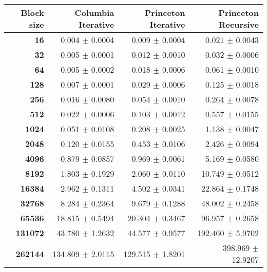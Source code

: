 \begin{tabular}{rrrr}\toprule
\textbf{Block size}  & \textbf{Columbia Iterative} & \textbf{Princeton Iterative} & \textbf{Princeton Recursive}\\\midrule
\textbf{16}  & 0.004 $\pm$ 0.0004 & 0.009 $\pm$ 0.0004 & 0.021 $\pm$ 0.0043\\
\textbf{32}  & 0.005 $\pm$ 0.0001 & 0.012 $\pm$ 0.0010 & 0.032 $\pm$ 0.0006\\
\textbf{64}  & 0.005 $\pm$ 0.0002 & 0.018 $\pm$ 0.0006 & 0.061 $\pm$ 0.0010\\
\textbf{128}  & 0.007 $\pm$ 0.0001 & 0.029 $\pm$ 0.0006 & 0.125 $\pm$ 0.0018\\
\textbf{256}  & 0.016 $\pm$ 0.0080 & 0.054 $\pm$ 0.0010 & 0.264 $\pm$ 0.0078\\
\textbf{512}  & 0.022 $\pm$ 0.0006 & 0.103 $\pm$ 0.0012 & 0.557 $\pm$ 0.0155\\
\textbf{1024}  & 0.051 $\pm$ 0.0108 & 0.208 $\pm$ 0.0025 & 1.138 $\pm$ 0.0047\\
\textbf{2048}  & 0.120 $\pm$ 0.0155 & 0.453 $\pm$ 0.0106 & 2.426 $\pm$ 0.0094\\
\textbf{4096}  & 0.879 $\pm$ 0.0857 & 0.969 $\pm$ 0.0061 & 5.169 $\pm$ 0.0580\\
\textbf{8192}  & 1.803 $\pm$ 0.1929 & 2.060 $\pm$ 0.0110 & 10.749 $\pm$ 0.0512\\
\textbf{16384}  & 2.962 $\pm$ 0.1311 & 4.502 $\pm$ 0.0341 & 22.864 $\pm$ 0.1748\\
\textbf{32768}  & 8.284 $\pm$ 0.2364 & 9.679 $\pm$ 0.1288 & 48.002 $\pm$ 0.2458\\
\textbf{65536}  & 18.815 $\pm$ 0.5494 & 20.304 $\pm$ 0.3467 & 96.957 $\pm$ 0.2658\\
\textbf{131072}  & 43.780 $\pm$ 1.2632 & 44.577 $\pm$ 0.9577 & 192.460 $\pm$ 5.9702\\
\textbf{262144} & 134.809 $\pm$ 2.0115 & 129.515 $\pm$ 1.8201 & 398.969 $\pm$ 12.9207\\
\bottomrule
\end{tabular}
